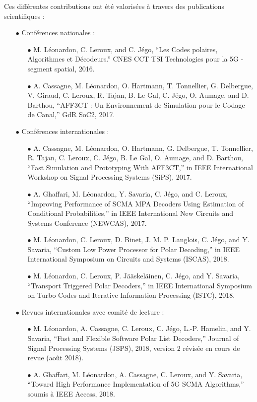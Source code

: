\vspace{1cm}
Ces différentes contributions ont été valorisées à travers des publications scientifiques : \\

\begin{itemize}
		\item[$\bullet$] Conférences nationales :
	\begin{itemize}
		\item[$\bullet$] M. Léonardon, C. Leroux, and C. Jégo, “Les Codes polaires, Algorithmes et Décodeurs.”
		CNES CCT TSI Technologies pour la 5G - segment spatial, 2016.
     	\item[$\bullet$] A. Cassagne, M. Léonardon, O. Hartmann, T. Tonnellier, G. Delbergue, V. Giraud, C. Leroux, R. Tajan, B. Le Gal, C. Jégo, O. Aumage, and D. Barthou, “AFF3CT : Un Environnement de Simulation pour le Codage de Canal,” GdR SoC2, 2017.
	\end{itemize}
	\item[$\bullet$] Conférences internationales :
	\begin{itemize}
		\item[$\bullet$]  A. Cassagne, M. Léonardon, O. Hartmann, G. Delbergue, T. Tonnellier, R. Tajan, C. Leroux, C. Jégo, B. Le Gal, O. Aumage, and D. Barthou, “Fast Simulation and Prototyping With AFF3CT,” in IEEE International Workshop on Signal Processing Systems (SiPS), 2017.
		\item[$\bullet$] A. Ghaffari, M. Léonardon, Y. Savaria, C. Jégo, and C. Leroux, “Improving Performance of SCMA MPA Decoders Using Estimation of Conditional Probabilities,” in IEEE International New Circuits and Systems Conference (NEWCAS), 2017.
		\item[$\bullet$] M. Léonardon, C. Leroux, D. Binet, J. M. P. Langlois, C. Jégo, and Y. Savaria, “Custom Low Power Processor for Polar Decoding,” in IEEE International Symposium on Circuits and Systems (ISCAS), 2018.
		\item[$\bullet$] M. Léonardon, C. Leroux, P. Jääskeläinen, C. Jégo, and Y. Savaria, “Transport Triggered Polar Decoders,” in IEEE International Symposium on Turbo Codes and Iterative Information Processing (ISTC), 2018.
	\end{itemize}
	\item[$\bullet$] Revues internationales avec comité de lecture :
	\begin{itemize}
		\item[$\bullet$] M. Léonardon, A. Cassagne, C. Leroux, C. Jégo, L.-P. Hamelin, and Y. Savaria, “Fast and Flexible Software Polar List Decoders,” Journal of Signal Processing Systems (JSPS), 2018, version 2 révisée en cours de revue (août 2018).
        \item[$\bullet$] A. Ghaffari, M. Léonardon, A. Cassagne, C. Leroux, and Y. Savaria, “Toward High Performance Implementation of 5G SCMA Algorithms,” soumis à IEEE Access, 2018.
	\end{itemize}
\end{itemize}

